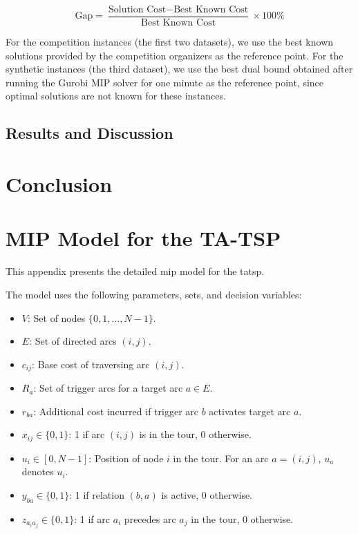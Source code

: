 \documentclass[twocolumn, switch]{article} %
\begin{document}
\begin{equation}
\text{Gap} = \frac{\text{Solution Cost} - \text{Best Known Cost}}{\text{Best Known Cost}} \times 100\%
\end{equation}

For the competition instances (the first two datasets), we use the best known solutions provided by the competition organizers as the reference point. For the synthetic instances (the third dataset), we use the best dual bound obtained after running the Gurobi MIP solver for one minute as the reference point, since optimal solutions are not known for these instances.

\subsection{Results and Discussion}
\lipsum[11]

\section{Conclusion}
\lipsum[12]

\appendix
\section{MIP Model for the TA-TSP}

This appendix presents the detailed \gls{mip} model for the \gls{tatsp}.

The model uses the following parameters, sets, and decision variables:
\begin{itemize}
    \item $V$: Set of nodes $\{0, 1, \dots, N-1\}$.
    \item $E$: Set of directed arcs $(i,j)$.
    \item $c_{ij}$: Base cost of traversing arc $(i,j)$.
    \item $R_a$: Set of trigger arcs for a target arc $a \in E$.
    \item $r_{ba}$: Additional cost incurred if trigger arc $b$ activates target arc $a$.
    \item $x_{ij} \in \{0, 1\}$: 1 if arc $(i,j)$ is in the tour, 0 otherwise.
    \item $u_i \in [0, N-1]$: Position of node $i$ in the tour. For an arc $a=(i,j)$, $u_a$ denotes $u_i$.
    \item $y_{ba} \in \{0, 1\}$: 1 if relation $(b,a)$ is active, 0 otherwise.
    \item $z_{a_ia_j} \in \{0, 1\}$: 1 if arc $a_i$ precedes arc $a_j$ in the tour, 0 otherwise.
\end{itemize}
\end{document}
